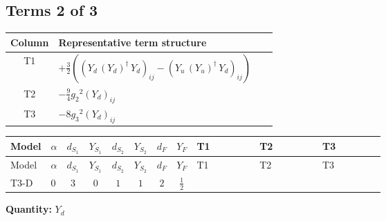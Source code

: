 \documentclass[8pt]{article}
\begin{document}
\begin{landscape}
\subsection*{Terms 2 of 3}
\begin{center}
\begin{tabular}{@{}c >{\raggedright\arraybackslash}p{0.82\linewidth}@{}}
\toprule
Column & Representative term structure \\
\midrule
T1 & \(\displaystyle +\frac{3}{2} (\left({Y_d}\,\left({Y_d}\right)^{\dagger}\,{Y_d}\right)_{ij}-\left({Y_u}\,\left({Y_u}\right)^{\dagger}\,{Y_d}\right)_{ij})\) \\
\midrule
T2 & \(\displaystyle -\frac{9}{4} {g_2}^2 \left({Y_d}\right)_{ij}\) \\
\midrule
T3 & \(\displaystyle -8 {g_3}^2 \left({Y_d}\right)_{ij}\) \\
\midrule
\bottomrule
\end{tabular}
\end{center}
\smallskip
\tiny
\begin{longtable}{@{}llcccccc >{\raggedright\arraybackslash}p{0.21\linewidth} >{\raggedright\arraybackslash}p{0.21\linewidth} >{\raggedright\arraybackslash}p{0.21\linewidth}@{}}
\toprule
Model & $\alpha$ & $d_{S_1}$ & $Y_{S_1}$ & $d_{S_2}$ & $Y_{S_2}$ & $d_F$ & $Y_F$ & T1 & T2 & T3 \\
\midrule
\endfirsthead
\toprule
Model & $\alpha$ & $d_{S_1}$ & $Y_{S_1}$ & $d_{S_2}$ & $Y_{S_2}$ & $d_F$ & $Y_F$ & T1 & T2 & T3 \\
\midrule
\endhead
T3-D & $0$ & $3$ & $0$ & $1$ & $1$ & $2$ & $\frac{1}{2}$ & \scriptsize\adjustbox{max width=\linewidth}{$\begin{gathered} +\frac{3}{2} (\left({Y_d}\,\left({Y_d}\right)^{\dagger}\,{Y_d}\right)_{ij}-\left({Y_u}\,\left({Y_u}\right)^{\dagger}\,{Y_d}\right)_{ij})\end{gathered}$} & \scriptsize\adjustbox{max width=\linewidth}{$\begin{gathered} -\frac{9}{4} {g_2}^2 \left({Y_d}\right)_{ij}\end{gathered}$} & \scriptsize\adjustbox{max width=\linewidth}{$\begin{gathered} -8 {g_3}^2 \left({Y_d}\right)_{ij}\end{gathered}$} \\
\midrule
\bottomrule
\end{longtable}
\clearpage
\noindent\textbf{Quantity: }$Y_d$\par\smallskip

\end{landscape}
\end{document}
